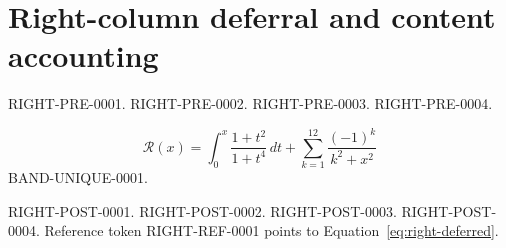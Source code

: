 \documentclass[twocolumn]{article}
\begin{document}
\section*{Right-column deferral and content accounting}
RIGHT-PRE-0001. \WBTextA
RIGHT-PRE-0002. \WBTextB
RIGHT-PRE-0003. \WBTextC
RIGHT-PRE-0004. \WBTextD
\begin{wideband}
\begin{equation}
  \mathcal{R}(x)=\int_0^x \frac{1+t^2}{1+t^4}\,dt
  +\sum_{k=1}^{12}\frac{(-1)^k}{k^2+x^2}
  \label{eq:right-deferred}
\end{equation}
BAND-UNIQUE-0001.
\end{wideband}
RIGHT-POST-0001. \WBTextE
RIGHT-POST-0002. \WBTextF
RIGHT-POST-0003. \WBTextG
RIGHT-POST-0004. \WBTextH
Reference token RIGHT-REF-0001 points to Equation~\ref{eq:right-deferred}.
\end{document}
